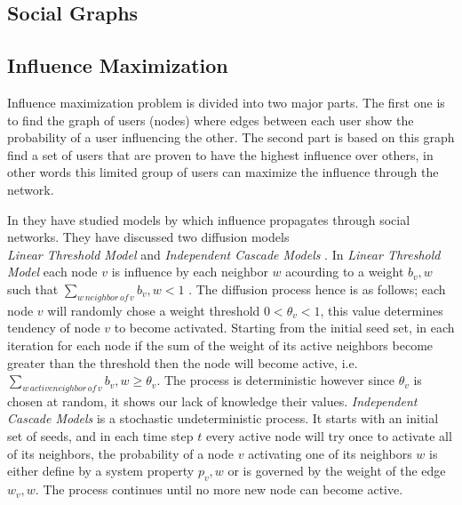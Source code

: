 \documentclass[english]{tktltiki}
\begin{document}
\subsection{Social Graphs}

\subsection{Influence Maximization}
Influence maximization problem is divided into two major parts. The first one is to find the graph of users (nodes) where edges between each user show the probability of  a user influencing the other. The second part is
based on this graph find a set of users that are proven to have the highest influence over others, in other words 
this limited group of users can maximize the influence through the network.

In \cite{kempe03} they have studied models by which influence propagates through social networks. They have discussed two diffusion models \\
\textit{Linear Threshold Model} and \textit{Independent Cascade Models} . In \textit{Linear Threshold Model} each node $v$ is influence by each neighbor $w$ acourding to a weight $b_v,w$ such that $\sum \nolimits_{w \, neighbor \, of \, v} b_v,w < 1$ . The diffusion process hence is as follows; each node $v$ will randomly chose a weight threshold $0 < \theta_v<1 $, this value determines tendency of node $v$ to become activated. Starting from the initial seed set, in each iteration for each node if the sum of the weight of its active neighbors become greater than the threshold then the node will become active, i.e. $\sum \nolimits_{w \, active neighbor \, of \, v} b_v,w  \geq \theta_v $. The process is deterministic however since $\theta_v$ is chosen at random, it shows our lack of knowledge their values. \textit{Independent Cascade Models} is a stochastic undeterministic process. It starts with an initial set of seeds, and in each time step $t$ every active node will try once to activate all of its neighbors, the probability of a node $v$ activating one of its neighbors $w$ is either define by a system property $p_v,w$ or is governed by the weight of the edge $w_v,w$. The process continues until no more new node can become active. 
\end{document}
